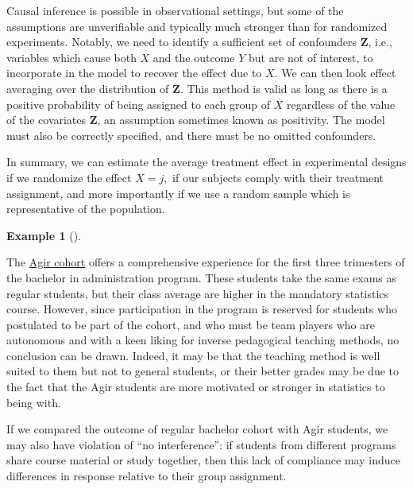 \documentclass[
  11pt,
  letterpaper,
]{scrbook}
\theoremstyle{definition}
\newtheorem{example}{Example}[chapter]
\theoremstyle{definition}
\theoremstyle{remark}
\begin{document}
\begin{tcolorbox}[enhanced jigsaw, bottomrule=.15mm, coltitle=black, colframe=quarto-callout-caution-color-frame, left=2mm, opacityback=0, breakable, opacitybacktitle=0.6, rightrule=.15mm, toprule=.15mm, title=\textcolor{quarto-callout-caution-color}{\faFire}\hspace{0.5em}{Conditional ignorability for observational data}, toptitle=1mm, leftrule=.75mm, titlerule=0mm, colback=white, arc=.35mm, bottomtitle=1mm, colbacktitle=quarto-callout-caution-color!10!white]

Causal inference is possible in observational settings, but some of the
assumptions are unverifiable and typically much stronger than for
randomized experiments. Notably, we need to identify a sufficient set of
confounders \(\boldsymbol{Z}\), i.e., variables which cause both \(X\)
and the outcome \(Y\) but are not of interest, to incorporate in the
model to recover the effect due to \(X\). We can then look effect
averaging over the distribution of \(\boldsymbol{Z}\). This method is
valid as long as there is a positive probability of being assigned to
each group of \(X\) regardless of the value of the covariates
\(\boldsymbol{Z}\), an assumption sometimes known as positivity. The
model must also be correctly specified, and there must be no omitted
confounders.

\end{tcolorbox}

In summary, we can estimate the average treatment effect in experimental
designs if we randomize the effect \(X=j,\) if our subjects comply with
their treatment assignment, and more importantly if we use a random
sample which is representative of the population.

\begin{example}[]\protect\hypertarget{exm-nonrandomtreatment}{}\label{exm-nonrandomtreatment}

The
\href{https://www.hec.ca/programmes/baccalaureats/parcours-agir/index.html}{Agir
cohort} offers a comprehensive experience for the first three trimesters
of the bachelor in administration program. These students take the same
exams as regular students, but their class average are higher in the
mandatory statistics course. However, since participation in the program
is reserved for students who postulated to be part of the cohort, and
who must be team players who are autonomous and with a keen liking for
inverse pedagogical teaching methods, no conclusion can be drawn.
Indeed, it may be that the teaching method is well suited to them but
not to general students, or their better grades may be due to the fact
that the Agir students are more motivated or stronger in statistics to
being with.

If we compared the outcome of regular bachelor cohort with Agir
students, we may also have violation of ``no interference'': if students
from different programs share course material or study together, then
this lack of compliance may induce differences in response relative to
their group assignment.

\end{example}
\end{document}
